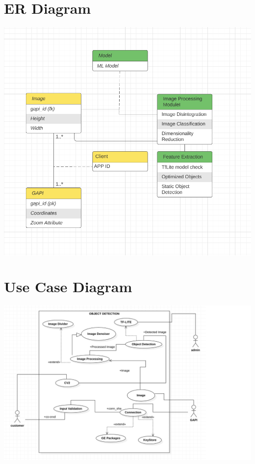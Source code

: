 \section{ER Diagram}
\includegraphics[scale=1.3]{images/er.png}
\section{Use Case Diagram}
\includegraphics[scale=0.48]{images/usecase.png}
